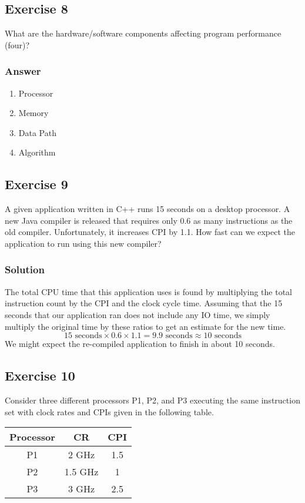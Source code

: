 \documentclass[12pt]{article}
\begin{document}
\subsection*{Exercise 8}
What are the hardware/software components affecting program performance (four)?
\subsubsection*{Answer}
\begin{enumerate}
\item Processor
\item Memory
\item Data Path
\item Algorithm
\end{enumerate}

\subsection*{Exercise 9}
A given application written in C++ runs 15 seconds on a desktop processor. A new Java compiler is released that requires only 0.6 as many instructions as the old compiler. Unfortunately, it increases CPI by 1.1. How fast can we expect the application to run using this new compiler?
\subsubsection*{Solution}
The total CPU time that this application uses is found by multiplying the total instruction count by the CPI and the clock cycle time. Assuming that the 15 seconds that our application ran does not include any IO time, we simply multiply the original time by these ratios to get an estimate for the new time.
\[
15\text{ seconds} \times 0.6 \times 1.1 = 9.9 \text{ seconds} \approx \boxed{10 \text{ seconds}}
\]
We might expect the re-compiled application to finish in about 10 seconds.

\subsection*{Exercise 10}
Consider three different processors P1, P2, and P3 executing the same instruction set with clock rates and CPIs given in the following table.

\begin{center}
\begin{tabular}{| c | c | c |}
\hline
Processor & CR & CPI \\
\hline
P1 & 2 GHz & 1.5 \\
\hline
P2 & 1.5 GHz & 1 \\
\hline
P3 & 3 GHz & 2.5 \\
\hline
\end{tabular}
\end{center}
\end{document}
